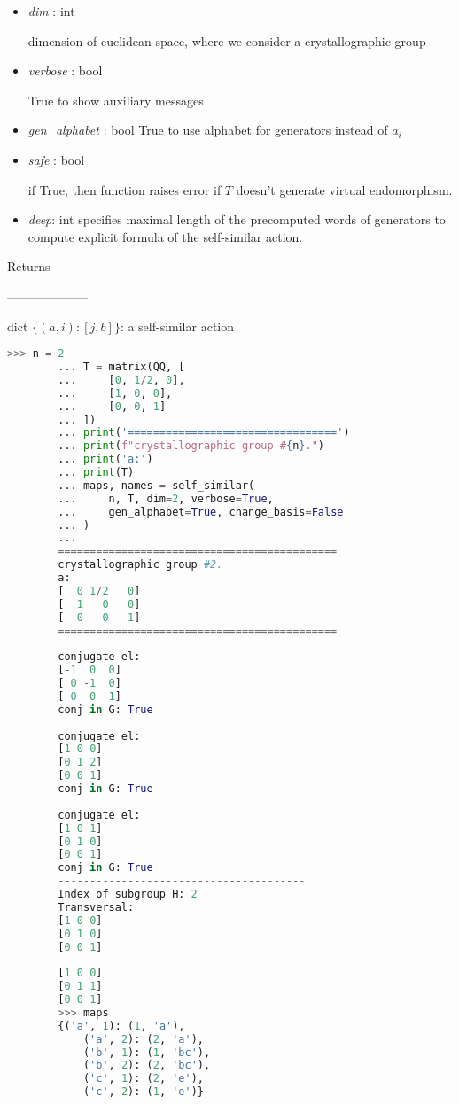 \documentclass[a4paper,12pt]{amsart}
\theoremstyle{definition}
\begin{document}
\begin{itemize}
\begin{itemize}
			\item \textit{dim} : int
			
			dimension of euclidean space, where we consider a crystallographic
			group
			
			\item \textit{verbose} : bool
			
			True to show auxiliary messages
			
			\item \textit{gen\_alphabet }: bool
			True to use alphabet for generators instead of $a_i$
			
			\item \textit{safe} : bool
			
			if True, then function raises error if $T$ doesn't generate
			virtual endomorphism.
			
			\item \textit{deep}: int
			specifies maximal length of the precomputed words of generators to
			compute explicit formula of the self-similar action.
									
		\end{itemize}
		
		Returns
		
		--------------------
		
		dict $\{ (a, i): [j, b] \}$: a self-similar action
		
		\begin{lstlisting}[language=python]
		>>> n = 2
		...	T = matrix(QQ, [
		...		[0, 1/2, 0], 
		...		[1, 0, 0], 
		...		[0, 0, 1]
		...	])
		...	print('=================================')
		...	print(f"crystallographic group #{n}.")
		...	print('a:')
		...	print(T)
		...	maps, names = self_similar(
		...		n, T, dim=2, verbose=True, 
		...		gen_alphabet=True, change_basis=False
		...	)
		...
		============================================
		crystallographic group #2.
		a:
		[  0 1/2   0]
		[  1   0   0]
		[  0   0   1]
		============================================
		
		conjugate el:
		[-1  0  0]
		[ 0 -1  0]
		[ 0  0  1]
		conj in G: True
		
		conjugate el:
		[1 0 0]
		[0 1 2]
		[0 0 1]
		conj in G: True
		
		conjugate el:
		[1 0 1]
		[0 1 0]
		[0 0 1]
		conj in G: True
		---------------------------------------
		Index of subgroup H: 2
		Transversal:
		[1 0 0]
		[0 1 0]
		[0 0 1]
		
		[1 0 0]
		[0 1 1]
		[0 0 1]
		>>> maps 
		{('a', 1): (1, 'a'),
			('a', 2): (2, 'a'),
			('b', 1): (1, 'bc'),
			('b', 2): (2, 'bc'),
			('c', 1): (2, 'e'),
			('c', 2): (1, 'e')}
		\end{lstlisting}
	\end{itemize}
	
\end{document}
